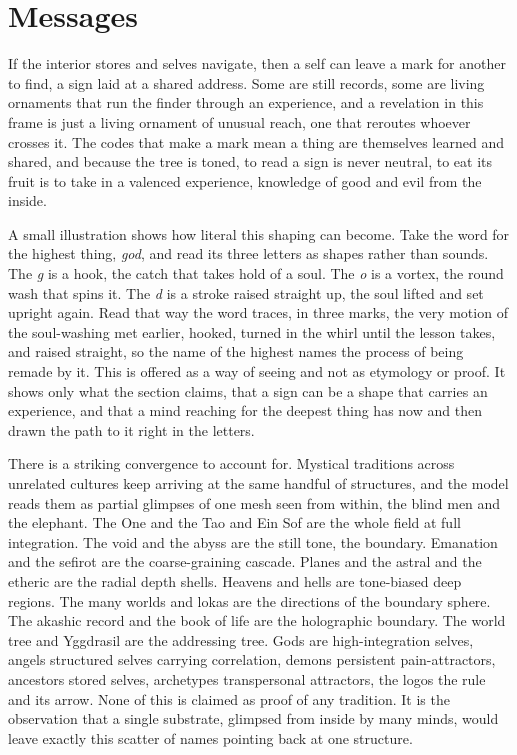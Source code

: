 \section{Messages}

If the interior stores and selves navigate, then a self can leave a mark for another to find, a sign laid at a shared address. Some are still records, some are living ornaments that run the finder through an experience, and a revelation in this frame is just a living ornament of unusual reach, one that reroutes whoever crosses it. The codes that make a mark mean a thing are themselves learned and shared, and because the tree is toned, to read a sign is never neutral, to eat its fruit is to take in a valenced experience, knowledge of good and evil from the inside.

A small illustration shows how literal this shaping can become. Take the word for the highest thing, \emph{god}, and read its three letters as shapes rather than sounds. The \emph{g} is a hook, the catch that takes hold of a soul. The \emph{o} is a vortex, the round wash that spins it. The \emph{d} is a stroke raised straight up, the soul lifted and set upright again. Read that way the word traces, in three marks, the very motion of the soul-washing met earlier, hooked, turned in the whirl until the lesson takes, and raised straight, so the name of the highest names the process of being remade by it. This is offered as a way of seeing and not as etymology or proof. It shows only what the section claims, that a sign can be a shape that carries an experience, and that a mind reaching for the deepest thing has now and then drawn the path to it right in the letters.

There is a striking convergence to account for. Mystical traditions across unrelated cultures keep arriving at the same handful of structures, and the model reads them as partial glimpses of one mesh seen from within, the blind men and the elephant. The One and the Tao and Ein Sof are the whole field at full integration. The void and the abyss are the still tone, the boundary. Emanation and the sefirot are the coarse-graining cascade. Planes and the astral and the etheric are the radial depth shells. Heavens and hells are tone-biased deep regions. The many worlds and lokas are the directions of the boundary sphere. The akashic record and the book of life are the holographic boundary. The world tree and Yggdrasil are the addressing tree. Gods are high-integration selves, angels structured selves carrying correlation, demons persistent pain-attractors, ancestors stored selves, archetypes transpersonal attractors, the logos the rule and its arrow. None of this is claimed as proof of any tradition. It is the observation that a single substrate, glimpsed from inside by many minds, would leave exactly this scatter of names pointing back at one structure.
